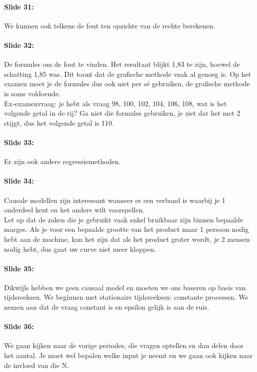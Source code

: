 \documentclass[10pt,a4paper]{report}
\begin{document}
\paragraph{Slide 31:} We kunnen ook telkens de fout ten opzichte van de rechte berekenen.

\paragraph{Slide 32:} De formules om de fout te vinden. Het resultaat blijkt 1,83 te zijn, hoewel de schatting 1,85 was. Dit toont dat de grafische methode vaak al genoeg is. Op het examen moet je de formules dus ook niet per s\'e gebruiken, de grafische methode is soms voldoende.\\
Ex-examenvraag: je hebt als vraag 98, 100, 102, 104, 106, 108, wat is het volgende getal in de rij? Ga niet die formules gebruiken, je ziet dat het met 2 stijgt, dus het volgende getal is 110.

\paragraph{Slide 33:} Er zijn ook andere regressiemethoden.

\paragraph{Slide 34:} Causale modellen zijn interessant wanneer er een verband is waarbij je 1 onderdeel kent en het andere wilt voorspellen.\\
Let op dat de zaken die je gebruikt vaak enkel bruikbaar zijn binnen bepaalde marges. Als je voor een bepaalde grootte van het product maar 1 persoon nodig hebt aan de machine, kan het zijn dat als het product groter wordt, je 2 mensen nodig hebt, dus gaat uw curve niet meer kloppen.

\paragraph{Slide 35:} Dikwijls hebben we geen causaal model en moeten we ons baseren op basis van tijdsreeksen. We beginnen met stationaire tijdsreeksen: constante processen. We nemen aan dat de vraag constant is en epsilon gelijk is aan de ruis.

\paragraph{Slide 36:} We gaan kijken naar de vorige periodes, die vragen optellen en dan delen door het aantal. Je moet wel bepalen welke input je neemt en we gaan ook kijken naar de invloed van die N.
\end{document}
